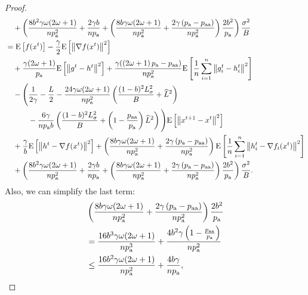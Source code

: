 \documentclass{article}
\newcommand*{\probavailable}{\ensuremath{p_{\textnormal{a}}}}
\newcommand*{\probpairaa}{\ensuremath{p_{\textnormal{aa}}}}
\begin{document}
\begin{proof}
\begin{align*}
      &\quad + \left(\frac{8 b^2 \gamma \omega (2 \omega + 1)}{n \probavailable^2} + \frac{2 \gamma b}{n \probavailable} + \left(\frac{8 b \gamma \omega (2 \omega + 1)}{n \probavailable^2} + \frac{2 \gamma \left(\probavailable - \probpairaa\right)}{n \probavailable^2}\right) \frac{2 b^2}{\probavailable}\right) \frac{\sigma^2}{B} \\
      &= \Exp{f(x^t)} - \frac{\gamma}{2}\Exp{\norm{\nabla f(x^t)}^2} \\
      &\quad + \frac{\gamma (2 \omega + 1)}{\probavailable} \Exp{\norm{g^{t} - h^{t}}^2} + \frac{\gamma (\left(2 \omega + 1\right)\probavailable - \probpairaa)}{n \probavailable^2} \Exp{\frac{1}{n}\sum_{i=1}^n\norm{g^{t}_i - h^{t}_i}^2} \\
      &\quad - \Bigg(\frac{1}{2\gamma} - \frac{L}{2} - \frac{24 \gamma \omega (2 \omega + 1)}{n \probavailable^2} \left(\frac{(1 - b)^2 L_{\sigma}^2}{B} + \widehat{L}^2\right) \\
      &\qquad\quad - \frac{6 \gamma}{n \probavailable b}\left(\frac{(1 - b)^2 L_{\sigma}^2}{B} + \left(1 - \frac{\probpairaa}{\probavailable}\right) \widehat{L}^2 \right)\Bigg) \Exp{\norm{x^{t+1} - x^t}^2} \\
      &\quad + \frac{\gamma}{b} \Exp{\norm{h^{t} - \nabla f(x^{t})}^2} + \left(\frac{8 b \gamma \omega (2 \omega + 1)}{n \probavailable^2} + \frac{2 \gamma \left(\probavailable - \probpairaa\right)}{n \probavailable^2}\right)\Exp{\frac{1}{n}\sum_{i=1}^n\norm{h^{t}_i - \nabla f_i(x^{t})}^2} \\
      &\quad + \left(\frac{8 b^2 \gamma \omega (2 \omega + 1)}{n \probavailable^2} + \frac{2 \gamma b}{n \probavailable} + \left(\frac{8 b \gamma \omega (2 \omega + 1)}{n \probavailable^2} + \frac{2 \gamma \left(\probavailable - \probpairaa\right)}{n \probavailable^2}\right) \frac{2 b^2}{\probavailable}\right) \frac{\sigma^2}{B}.
    \end{align*}
    Also, we can simplify the last term:
    \begin{align*}
      &\left(\frac{8 b \gamma \omega (2 \omega + 1)}{n \probavailable^2} + \frac{2 \gamma \left(\probavailable - \probpairaa\right)}{n \probavailable^2}\right) \frac{2 b^2}{\probavailable} \\
      &= \frac{16 b^3 \gamma \omega (2 \omega + 1)}{n \probavailable^3} + \frac{4 b^2 \gamma \left(1 - \frac{\probpairaa}{\probavailable}\right)}{n \probavailable^2} \\
      &\leq \frac{16 b^2 \gamma \omega (2 \omega + 1)}{n \probavailable^2} + \frac{4 b \gamma}{n \probavailable},

\end{align*}
\end{proof}
\end{document}
